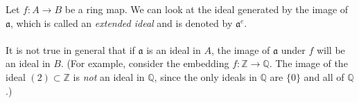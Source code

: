 \documentclass[12pt]{article}
\begin{document}
Let $f: A \to B$ be a ring map. We can look at the ideal generated by the image of $\mathfrak{a}$, which is called an {\em extended ideal} and is denoted by $\mathfrak{a}^e$. \\
\\
It is not true in general that if $\mathfrak{a}$ is an ideal in $A$,  the image of $\mathfrak{a}$ under $f$ will be an ideal in $B$. (For example, consider the embedding $f: \mathbb{Z} \to \mathbb{Q}$. The image of the ideal $(2) \subset \mathbb{Z}$ is {\em not} an ideal in $\mathbb{Q}$, since the only ideals in $\mathbb{Q}$ are $\{0\}$ and all of $\mathbb{Q}$.)
\end{document}

